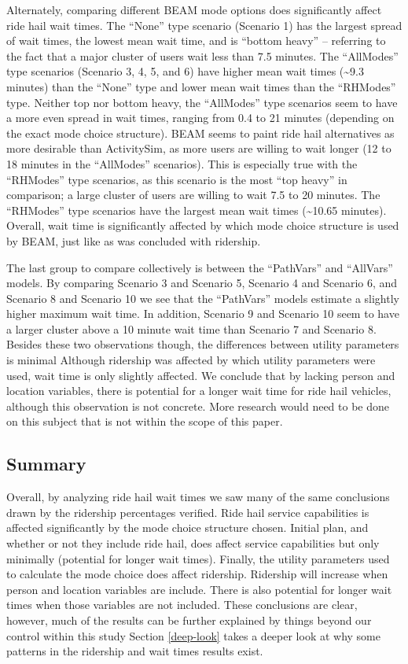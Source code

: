 \documentclass[12pt, oneside, openright]{byuthesis}
\begin{document}
Alternately, comparing different BEAM mode options does significantly affect ride hail wait times. The ``None'' type scenario (Scenario 1) has the largest spread of wait times, the lowest mean wait time, and is ``bottom heavy'' -- referring to the fact that a major cluster of users wait less than 7.5 minutes. The ``AllModes'' type scenarios (Scenario 3, 4, 5, and 6) have higher mean wait times (\textasciitilde9.3 minutes) than the ``None'' type and lower mean wait times than the ``RHModes'' type. Neither top nor bottom heavy, the ``AllModes'' type scenarios seem to have a more even spread in wait times, ranging from 0.4 to 21 minutes (depending on the exact mode choice structure). BEAM seems to paint ride hail alternatives as more desirable than ActivitySim, as more users are willing to wait longer (12 to 18 minutes in the ``AllModes'' scenarios). This is especially true with the ``RHModes'' type scenarios, as this scenario is the most ``top heavy'' in comparison; a large cluster of users are willing to wait 7.5 to 20 minutes. The ``RHModes'' type scenarios have the largest mean wait times (\textasciitilde10.65 minutes). Overall, wait time is significantly affected by which mode choice structure is used by BEAM, just like as was concluded with ridership.

The last group to compare collectively is between the ``PathVars'' and ``AllVars'' models. By comparing Scenario 3 and Scenario 5, Scenario 4 and Scenario 6, and Scenario 8 and Scenario 10 we see that the ``PathVars'' models estimate a slightly higher maximum wait time. In addition, Scenario 9 and Scenario 10 seem to have a larger cluster above a 10 minute wait time than Scenario 7 and Scenario 8. Besides these two observations though, the differences between utility parameters is minimal Although ridership was affected by which utility parameters were used, wait time is only slightly affected. We conclude that by lacking person and location variables, there is potential for a longer wait time for ride hail vehicles, although this observation is not concrete. More research would need to be done on this subject that is not within the scope of this paper.

\hypertarget{summary-1}{%
\subsection{Summary}\label{summary-1}}

Overall, by analyzing ride hail wait times we saw many of the same conclusions drawn by the ridership percentages verified. Ride hail service capabilities is affected significantly by the mode choice structure chosen. Initial plan, and whether or not they include ride hail, does affect service capabilities but only minimally (potential for longer wait times). Finally, the utility parameters used to calculate the mode choice does affect ridership. Ridership will increase when person and location variables are include. There is also potential for longer wait times when those variables are not included. These conclusions are clear, however, much of the results can be further explained by things beyond our control within this study Section \ref{deep-look} takes a deeper look at why some patterns in the ridership and wait times results exist.
\end{document}
